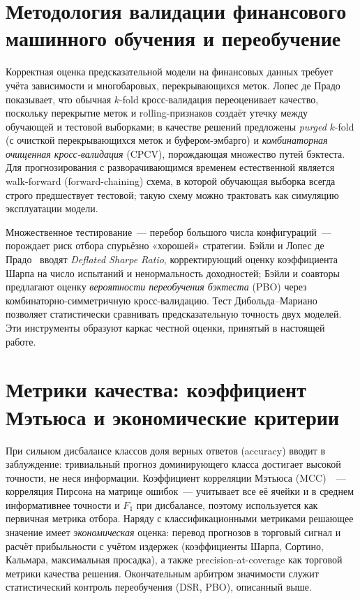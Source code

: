 \documentclass[12pt,a4paper]{report}
\begin{document}
\section{Методология валидации финансового машинного обучения и переобучение}

Корректная оценка предсказательной модели на финансовых данных требует учёта
зависимости и многобаровых, перекрывающихся меток. Лопес де Прадо~\cite{lopez2018}
показывает, что обычная $k$-fold кросс-валидация переоценивает качество, поскольку
перекрытие меток и rolling-признаков создаёт утечку между обучающей и тестовой
выборками; в качестве решений предложены \emph{purged} $k$-fold (с очисткой
перекрывающихся меток и буфером-эмбарго) и \emph{комбинаторная очищенная
кросс-валидация} (CPCV), порождающая множество путей бэктеста. Для прогнозирования
с разворачивающимся временем естественной является walk-forward (forward-chaining)
схема, в которой обучающая выборка всегда строго предшествует тестовой; такую схему
можно трактовать как симуляцию эксплуатации модели.

Множественное тестирование~--- перебор большого числа конфигураций~--- порождает
риск отбора спурьёзно «хорошей» стратегии. Бэйли и Лопес де Прадо~\cite{bailey2014}
вводят \emph{Deflated Sharpe Ratio}, корректирующий оценку коэффициента Шарпа на
число испытаний и ненормальность доходностей; Бэйли и соавторы~\cite{bailey2017}
предлагают оценку \emph{вероятности переобучения бэктеста} (PBO) через
комбинаторно-симметричную кросс-валидацию. Тест Дибольда--Мариано~\cite{diebold1995}
позволяет статистически сравнивать предсказательную точность двух моделей. Эти
инструменты образуют каркас честной оценки, принятый в настоящей работе.

\section{Метрики качества: коэффициент Мэтьюса и экономические критерии}

При сильном дисбалансе классов доля верных ответов (accuracy) вводит в заблуждение:
тривиальный прогноз доминирующего класса достигает высокой точности, не неся
информации. Коэффициент корреляции Мэтьюса (MCC)~\cite{matthews1975}~--- корреляция
Пирсона на матрице ошибок~--- учитывает все её ячейки и в среднем информативнее
точности и $F_1$ при дисбалансе, поэтому используется как первичная метрика отбора.
Наряду с классификационными метриками решающее значение имеет \emph{экономическая}
оценка: перевод прогнозов в торговый сигнал и расчёт прибыльности с учётом издержек
(коэффициенты Шарпа, Сортино, Кальмара, максимальная просадка), а также
precision-at-coverage как торговой метрики качества решения. Окончательным арбитром
значимости служит статистический контроль переобучения (DSR, PBO), описанный выше.
\end{document}
